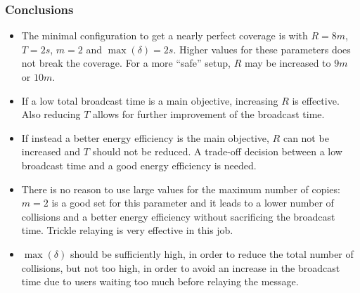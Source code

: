 \subsubsection{Conclusions}\label{subsubsec:hdconclusions}

\begin{itemize}
	\item The minimal configuration to get a nearly perfect coverage is with
		\(R\!=\!8m\), \(T\!=\!2s\), \(m\!=\!2\) and
		\(\max(\delta)\!=\!2s\). Higher values for these parameters does
		not break the coverage. For a more ``safe'' setup, \(R\) may be
		increased to \(9m\) or \(10m\).
	\item If a low total broadcast time is a main objective, increasing
		\(R\) is effective. Also reducing \(T\) allows for further
		improvement of the broadcast time.
	\item If instead a better energy efficiency is the main objective, \(R\)
		can not be increased and \(T\) should not be reduced. A
		trade-off decision between a low broadcast time and a good
		energy efficiency is needed.
	\item There is no reason to use large values for the maximum number of
		copies: \(m\!=\!2\) is a good set for this parameter and it
		leads to a lower number of collisions and a better energy
		efficiency without sacrificing the broadcast time. Trickle
		relaying is very effective in this job.
	\item \(\max(\delta)\) should be sufficiently high, in order to reduce
		the total number of collisions, but not too high, in order to
		avoid an increase in the broadcast time due to users waiting too
		much before relaying the message.
\end{itemize}
